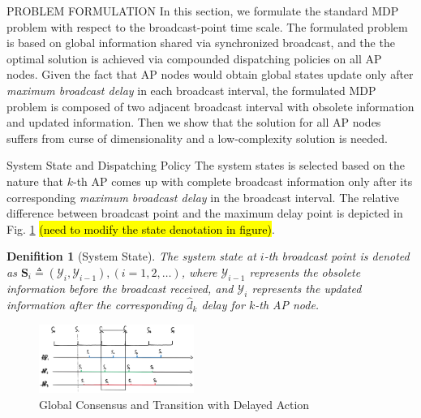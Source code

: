 \documentclass[10pt, conference, letterpaper]{IEEEtran}
\newtheorem{definition}{Denifition}
\newcommand{\define}{\triangleq}
\newcommand{\Stat}{\mathbf{S}}
\newcommand{\Obsv}{\mathcal{Y}}
\begin{document}
    \begin{section}{PROBLEM FORMULATION}
        \label{sec:formulation}
        In this section, we formulate the standard MDP problem with respect to the broadcast-point time scale. The formulated problem is based on global information shared via synchronized broadcast, and the the optimal solution is achieved via compounded dispatching policies on all AP nodes.
        Given the fact that AP nodes would obtain global states update only after \emph{maximum broadcast delay} in each broadcast interval, the formulated MDP problem is composed of two adjacent broadcast interval with obsolete information and updated information.
        Then we show that the solution for all AP nodes suffers from curse of dimensionality and a low-complexity solution is needed.

        \begin{subsection}{System State and Dispatching Policy}
            The system states is selected based on the nature that $k$-th AP comes up with complete broadcast information only after its corresponding \emph{maximum broadcast delay} in the broadcast interval.
            The relative difference between broadcast point and the maximum delay point is depicted in Fig. \ref{fig:br-trans} \hl{(need to modify the state denotation in figure)}.
            \begin{definition}[System State]
                The system state at $i$-th broadcast point is denoted as $\Stat_i \define (\Obsv_{i}, \Obsv_{i-1}), (i=1,2,\dots)$, where $\Obsv_{i-1}$ represents the obsolete information before the broadcast received, and $\Obsv_{i}$ represents the updated information after the corresponding $\hat{d}_k$ delay for $k$-th AP node.
            \end{definition}

            \begin{figure}[ht]
                \centering
                \includegraphics[width=0.45\textwidth]{broadcast-trans.png}
                \caption{Global Consensus and Transition with Delayed Action}
                \label{fig:br-trans}
            \end{figure}


\end{subsection}
\end{section}
\end{document}
